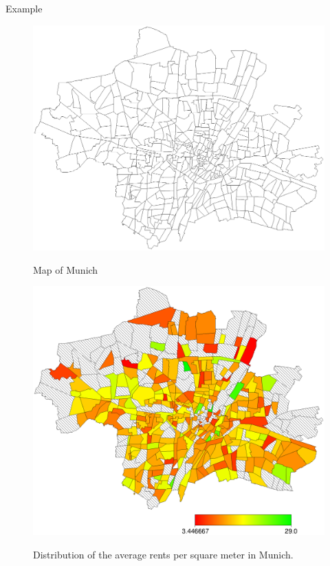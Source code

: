 \begin{stanza}{Example}
{\begin{figure}[htb]
\begin{center}
\includegraphics[scale=0.5]{grafiken/munichdrawmap.ps}
{\em\caption{ \label{munichdrawmap} Map of Munich}}
\vspace*{1cm}
\includegraphics[scale=0.5]{grafiken/munichmeansdrawmap.ps}
{\em\caption{ \label{munichmeans} Distribution of the average
rents per square meter in Munich.}}
\end{center}
\end{figure}

\clearpage

}
\end{stanza}
